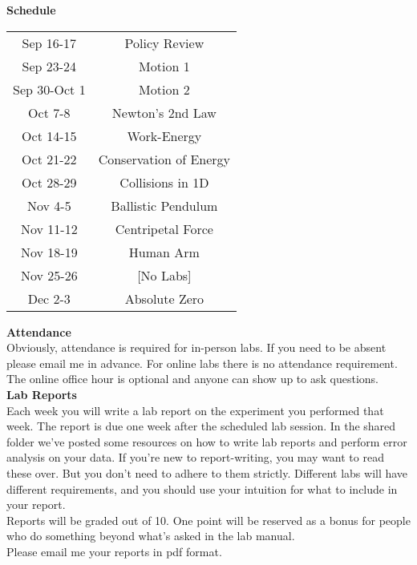 \documentclass[11pt]{extarticle}
\begin{document}
{\bf \Large Schedule} \\ 

\begin{table}[h]
	\centering
		\begin{tabular}{ c 	c }
			Sep 16-17 & Policy Review \\ 
			Sep 23-24 & Motion 1 \\ 
			Sep 30-Oct 1 & Motion 2 \\ 
			Oct 7-8 & Newton's 2nd Law \\ 
			Oct 14-15 & Work-Energy \\ 
			Oct 21-22 & Conservation of Energy \\ 
			Oct 28-29 & Collisions in 1D \\ 
			Nov 4-5 & Ballistic Pendulum \\ 
			Nov 11-12 & Centripetal Force \\ 
			Nov 18-19 & Human Arm \\ 
			Nov 25-26 & [No Labs] \\ 
			Dec 2-3 & Absolute Zero \\ 
		\end{tabular}
\end{table}

\newpage

{\bf \Large Attendance} \\ 

Obviously, attendance is required for in-person labs. If you need to be absent please email me in advance. For online labs there is no attendance requirement. The online office hour is optional and anyone can show up to ask questions. \\ 

{\bf \Large Lab Reports} \\ 

Each week you will write a lab report on the experiment you performed that week. The report is due one week after the scheduled lab session. In the shared folder we've posted some resources on how to write lab reports and perform error analysis on your data. If you're new to report-writing, you may want to read these over. But you don't need to adhere to them strictly. Different labs will have different requirements, and you should use your intuition for what to include in your report. \\ 

Reports will be graded out of 10. One point will be reserved as a bonus for people who do something beyond what's asked in the lab manual. \\ 

Please email me your reports in pdf format. \\ 
\end{document}
